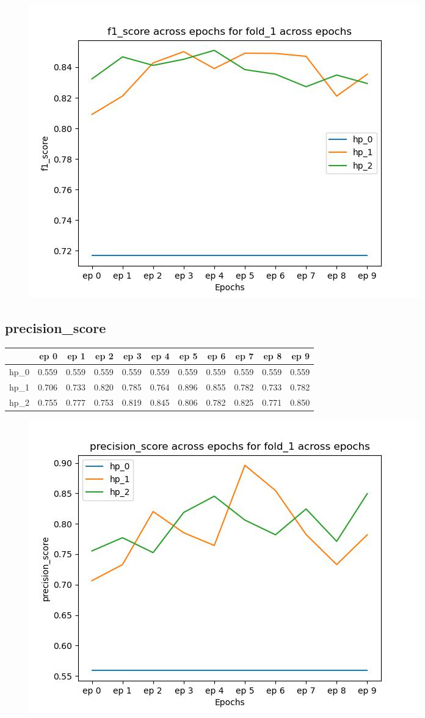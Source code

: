 \documentclass{article}
\begin{document}
\begin{figure}[H]
\includegraphics[scale = 0.75]{fold_1/f1_score}
\end{figure}
\subsection{precision\_score}
\begin{tabular}{lrrrrrrrrrr}
\toprule
{} &   ep 0 &   ep 1 &   ep 2 &   ep 3 &   ep 4 &   ep 5 &   ep 6 &   ep 7 &   ep 8 &   ep 9 \\
\midrule
hp\_0 &  0.559 &  0.559 &  0.559 &  0.559 &  0.559 &  0.559 &  0.559 &  0.559 &  0.559 &  0.559 \\
hp\_1 &  0.706 &  0.733 &  0.820 &  0.785 &  0.764 &  0.896 &  0.855 &  0.782 &  0.733 &  0.782 \\
hp\_2 &  0.755 &  0.777 &  0.753 &  0.819 &  0.845 &  0.806 &  0.782 &  0.825 &  0.771 &  0.850 \\
\bottomrule
\end{tabular}

\begin{figure}[H]
\includegraphics[scale = 0.75]{fold_1/precision_score}
\end{figure}
\end{document}
